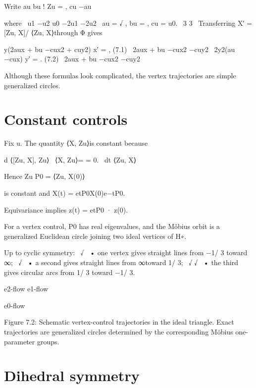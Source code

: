Write au bu ! Zu = , cu −au


\begin{displaytext}
where \
u1 −u2 u0 −2u1 −2u2 \
au = √ , bu = , cu = u0. \
3 3 \
Transferring X′ = [Zu, X]/ ⟨Zu, X⟩through Φ gives
\end{displaytext}

\begin{displaytext}
y(2aux + bu −cux2 + cuy2) x′ = , (7.1) \
2aux + bu −cux2 −cuy2 \
2y2(au −cux) y′ = . (7.2) \
2aux + bu −cux2 −cuy2
\end{displaytext}

Although these formulas look complicated, the vertex trajectories are simple generalized circles.


\section{Constant controls}

Fix u. The quantity ⟨X, Zu⟩is constant because


\begin{displaytext}
d ⟨[Zu, X], Zu⟩ \
⟨X, Zu⟩= = 0. \
dt ⟨Zu, X⟩
\end{displaytext}

Hence Zu P0 = ⟨Zu, X(0)⟩


is constant and X(t) = etP0X(0)e−tP0.


Equivariance implies z(t) = etP0 · z(0).


For a vertex control, P0 has real eigenvalues, and the Möbius orbit is a generalized Euclidean circle joining two ideal vertices of H∗.


\begin{displaytext}
Up to cyclic symmetry: \
√ \
• one vertex gives straight lines from −1/ 3 toward ∞; \
√ \
• a second gives straight lines from ∞toward 1/ 3; \
√ √ \
• the third gives circular arcs from 1/ 3 toward −1/ 3.
\end{displaytext}

e2-flow e1-flow


e0-flow


\begin{figureplaceholder}
Figure 7.2: Schematic vertex-control trajectories in the ideal triangle. Exact trajectories are generalized circles determined by the corresponding Möbius one-parameter groups.
\end{figureplaceholder}

\section{Dihedral symmetry}

